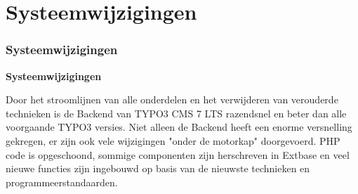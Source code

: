 %

\section{Systeemwijzigingen}
\begin{frame}[fragile]
	\frametitle{Systeemwijzigingen}

	\begin{center}\huge{\color{typo3darkgrey}\textbf{Systeemwijzigingen}}\end{center}

	Door het stroomlijnen van alle onderdelen en het verwijderen van verouderde
	technieken is de Backend van TYPO3 CMS 7 LTS razendsnel en beter dan alle
	voorgaande TYPO3 versies.\newline
	Niet alleen de Backend heeft een enorme versnelling gekregen, er zijn ook vele
	wijzigingen "onder de motorkap" doorgevoerd. PHP code is opgeschoond, sommige
	componenten zijn herschreven in Extbase en veel nieuwe functies zijn ingebouwd op
	basis van de nieuwste technieken en programmeerstandaarden.

\end{frame}


